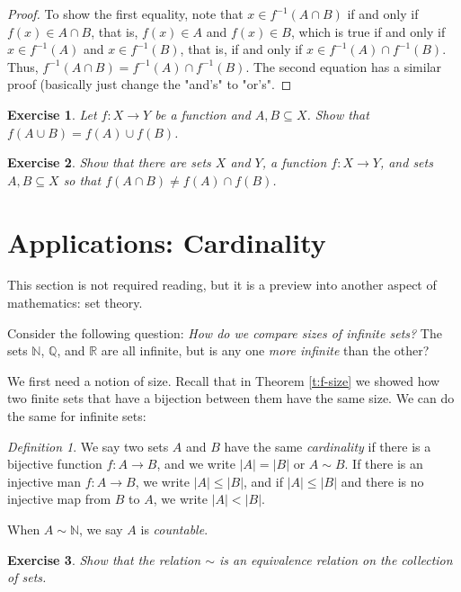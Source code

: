 \documentclass[a4paper,12pt,dvipsnames]{book}
\newtheorem{exercise}{Exercise}
\numberwithin{theorem}{chapter}
\theoremstyle{remark}
\newtheorem{definition}[theorem]{Definition}
\begin{document}
\begin{proof}
To show the first equality, note that $x\in f^{-1}(A\cap B)$ if and only if $f(x)\in A\cap B$, that is, $f(x)\in A$ and $f(x)\in B$, which is true if and only if $x\in f^{-1}(A)$ and $x\in f^{-1}(B)$, that is, if and only if $x\in f^{-1}(A)\cap f^{-1}(B)$. Thus, $f^{-1}(A\cap B)=f^{-1}(A)\cap f^{-1}(B)$. The second equation has a similar proof (basically just change the "and's" to "or's".
\end{proof}


\begin{exercise}
Let $f:X\rightarrow Y$ be a function and $A,B\subseteq X$. Show that $f(A\cup B)=f(A)\cup f(B)$. 
\end{exercise}

\begin{exercise}
Show that there are sets $X$ and $Y$, a function $f:X\rightarrow Y$, and sets $A,B\subseteq X$ so that $f(A\cap B)\neq f(A)\cap f(B)$. 
\end{exercise}





\section{Applications: Cardinality}

This section is not required reading, but it is a preview into another aspect of mathematics: set theory. 

Consider the following question: {\it How do we compare sizes of infinite sets?} The sets $\mathbb{N}$, $\mathbb{Q}$, and $\mathbb{R}$ are all infinite, but is any one {\it more infinite} than the other? 

We first need a notion of size. Recall that in Theorem \ref{t:f-size} we showed how two finite sets that have a bijection between them have the same size. We can do the same for infinite sets:

\begin{definition}
We say two sets $A$ and $B$ have the same {\it cardinality} if there is a bijective function $f:A\rightarrow B$, and we write $|A|=|B|$ or $A\sim B$. If there is an injective man $f:A\rightarrow B$, we write $|A|\leq |B|$, and if $|A|\leq |B|$ and there is no injective map from $B$ to $A$, we write $|A|<|B|$.

When $A\sim \mathbb{N}$, we say $A$ is {\it countable}. 
\end{definition}

\begin{exercise}
Show that the relation $\sim$ is an equivalence relation on the collection of sets. 
\end{exercise}
\end{document}
